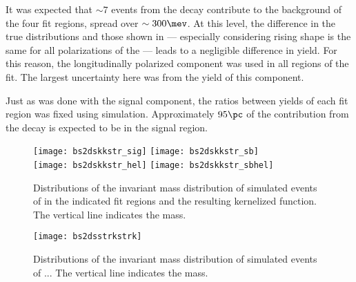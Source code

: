 It was expected that $\sim7$ events from the decay \btodsstrphi contribute to the background of the
four fit regions, spread over $\sim300\mev$.
At this level, the difference in the true distributions and those shown in 
--- especially considering rising shape is the same for all polarizations of the \phii ---
leads to a negligible difference in yield.
For this reason, the longitudinally polarized \btodsstrphi component was used in all regions of the
fit.
The largest uncertainty here was from the yield of this component.

Just as was done with the signal component, the ratios between yields of each fit region was fixed
using simulation.
Approximately $95\pc$ of the contribution from the decay \btodsstrphi is expected to be in the
signal region.


\begin{figure}
  \begin{center}
    \texttt{[image: bs2dskkstr\_sig]}
    \texttt{[image: bs2dskkstr\_sb]}\\
    \texttt{[image: bs2dskkstr\_hel]}
    \texttt{[image: bs2dskkstr\_sbhel]}
    \caption[Shapes of background contributions of \bstodskstrk]
    {\small
      Distributions of the invariant mass distribution of simulated events of \bstodskstrk
      in the indicated fit regions and the resulting kernelized function.
      The vertical line indicates the \Bp mass.
    }
    \label{fig:dsphi:bstodskstrk}
  \end{center}
\end{figure}


\begin{figure}
  \begin{center}
    \texttt{[image: bs2dsstrkstrk]}
    \caption[Shapes of background contributions of \bstodsstrkstrk]
    {\small
      Distributions of the invariant mass distribution of simulated events of \bstodsstrkstrk...
      The vertical line indicates the \Bp mass.
    }
    \label{fig:dsphi:bstodskstrk}
  \end{center}
\end{figure}


